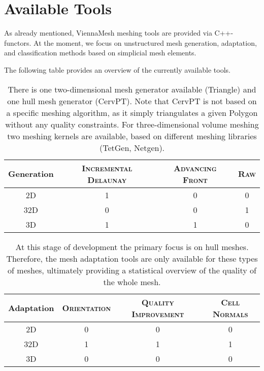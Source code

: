 
\section{Available Tools} 

As already mentioned, ViennaMesh meshing tools are provided via C++-functors.
At the moment, we focus on unstructured mesh generation, adaptation, and 
classification methods based on simplicial mesh elements.

The following table provides an overview of the currently available tools.


\begin{table}[!ht]
\begin{center}
\begin{tabular}{|c|c|c|c|}
\hline
\textbf{Generation} & \textsc{Incremental Delaunay} & \textsc{Advancing Front} & \textsc{Raw} \\  
\hline
\textsc{2D}        &        1 & 0 & 0 \\
\textsc{32D}       &        0 & 0 & 1 \\
\textsc{3D}        &        1 & 1 & 0 \\
\hline
\end{tabular}
\end{center}
\caption{There is one two-dimensional mesh generator available (Triangle) and 
one hull mesh generator (CervPT). Note that CervPT is not based on a specific 
meshing algorithm, as it simply triangulates a given Polygon without any 
quality constraints. For three-dimensional volume meshing 
two meshing kernels are available, based on different meshing libraries (TetGen, Netgen).}
\end{table} 

\begin{table}[!ht]
\begin{center}
\begin{tabular}{|c|c|c|c|}
\hline
\textbf{Adaptation} & \textsc{Orientation} & \textsc{Quality Improvement} & \textsc{Cell Normals} \\  
\hline
\textsc{2D}         &        0 &        0 &        0 \\
\textsc{32D}        &        1 &        1 &        1 \\
\textsc{3D}         &        0 &        0 &        0 \\
\hline
\end{tabular}
\end{center}
\caption{At this stage of development the primary focus is on hull meshes. Therefore, 
the mesh adaptation tools are only available for these types of meshes, ultimately 
providing a statistical overview of the quality of the whole mesh.}
\end{table} 

